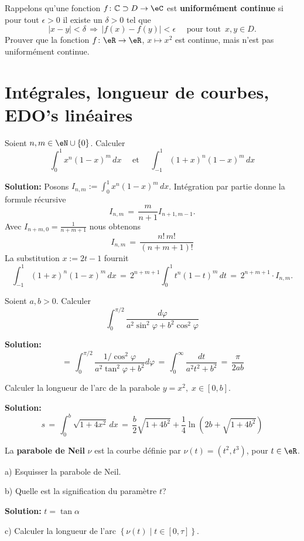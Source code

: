 Rappelons qu'une fonction $f \colon \mathbb{C} \supset D \to \eC$ est {\bf uniformément continue} si pour tout $\epsilon >0$ il existe un \( \delta>0\) tel que 
$$
|x-y| < \delta \,\Longrightarrow\, |f(x)-f(y)| < \epsilon 
\quad \text{ pour tout }\, x,y \in D.
$$
Prouver que la fonction $f \colon \eR \to \eR$, $x \mapsto x^2$ est continue, mais n'est pas uniformément continue.


\section{Intégrales, longueur de courbes, EDO's linéaires}


\exerNico 
Soient $n,m \in \eN \cup \{0\}$.
Calculer
$$
\int_0^1 x^n (1-x)^m \,dx
\quad \text{ et } \quad
\int_{-1}^1 (1+x)^n (1-x)^m \,dx
$$

{\bf Solution:}
Posons $I_{n,m} := \int_0^1 x^n (1-x)^m \,dx$.
Intégration par partie donne
la formule récursive
$$
I_{n,m} \,=\, \frac {m}{n+1} I_{n+1,m-1}.
$$
Avec $I_{n+m,0} = \frac{1}{n+m+1}$ nous obtenons
$$
I_{n,m} \,=\, \frac{n!\,m!}{(n+m+1)!}
$$
La substitution $x := 2t-1$ fournit
$$
\int_{-1}^1 (1+x)^n (1-x)^m \,dx
\,=\, 2^{n+m+1} \int_0^1 t^n (1-t)^m \,dt \,=\,  2^{n+m+1} 
\cdot I_{n,m}. 
$$




\exerNico 
Soient $a,b >0$. 
Calculer
$$
\int_0^{\pi /2} \displaystyle \frac{d \varphi}{a^2 \sin^2 \varphi + b^2 \cos^2 \varphi}
$$

{\bf Solution:}
$$
\,=\, \int_0^{\pi /2} \frac{1 / \cos^2 \varphi}{a^2 \tan^2 \varphi+b^2} d\varphi \,=\, \int_0^\infty \frac {dt}{a^2t^2 + b^2} \,=\, \frac{\pi}{2ab}  
$$


\exerNico  
Calculer la longueur de l'arc de la parabole $y = x^2,\;x \in [0,b]$.

\medskip
{\bf Solution:}
$$
s \,=\, \int_0^b \sqrt{1+4x^2} \,dx \,=\, \frac b 2 \sqrt{1+4b^2}+ \frac 14 \ln \left(2b+ \sqrt{1+4b^2} \right)
$$


\exerNico  
La {\bf parabole de Neil} $\nu$ est la courbe définie par $\nu (t) = (t^2,t^3)$, pour  $t \in \eR$.

\medskip
a)
Esquisser la parabole de Neil.

\medskip
b)
Quelle est la signification du paramètre $t$?

\medskip
{\bf Solution:} $t = \tan \alpha$

\medskip
c)
Calculer la longueur de l'arc 
$\left\{ \nu (t) \mid t \in [0,\tau] \right\}$.


